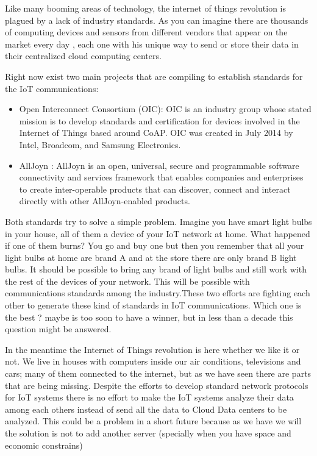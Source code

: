 Like many booming areas of technology, the internet of things revolution is
plagued by a lack of industry standards. As you can imagine there are thousands
of computing devices and sensors from different vendors that appear on the
market  every day , each one with his unique way to send  or store their data
in their centralized cloud computing centers.

Right now exist two main projects that are compiling to establish standards for
the IoT communications: 

\begin{itemize}
\item Open Interconnect Consortium (OIC): OIC is an industry group whose stated 
mission is to develop standards and certification for devices involved in the 
Internet of Things based around CoAP. OIC was created in July 2014 by Intel, 
Broadcom, and Samsung Electronics.\cite{OIC}

\item AllJoyn : AllJoyn is an open, universal, secure and programmable software 
connectivity and services framework that enables companies and enterprises to 
create inter-operable products that can discover, connect and interact directly 
with other AllJoyn-enabled products. \cite{AllJoyn}
\end{itemize}


Both standards try to solve a simple problem. Imagine you have smart light bulbs
in your house, all of them a device of your IoT network at home. What happened
if one of them burns? You go and buy one but then you remember that all your
light bulbs at home are brand A and at the store there are only brand B
light bulbs. It should be possible to bring any brand of light bulbs and
still work with the rest of the devices of your network. This will be possible
with communications standards among the industry.These two efforts are fighting
each other to generate these kind of standards in IoT communications. Which one
is the best ? maybe is too soon to have a winner, but in less than a decade
this question might be answered. 

In the meantime the Internet of Things revolution is here whether we like it or
not. We live in houses with computers inside our air conditions, televisions
and cars; many of them connected to the internet, but as we have seen there are
parts that are being missing. Despite the efforts to develop standard network
protocols for IoT systems there is no effort to make the IoT systems analyze
their data among each others instead of send  all the data to Cloud Data
centers to be analyzed. This could be a problem in a short future because as we
have we will the solution is not to add another server (specially when you have
space and economic constrains)


